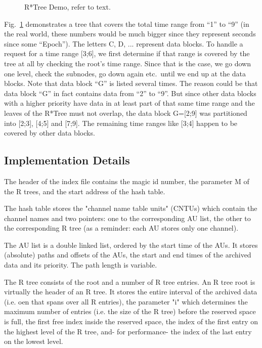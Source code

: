 \begin{figure}[htb]
\begin{center}
\end{center}
\caption{\label{fig:rtree}R*Tree Demo, refer to text.}
\end{figure}

Fig.~\ref{fig:rtree} demonstrates a tree that covers the total
time range from ``1'' to ``9'' (in the real world, these numbers would
be much bigger since they represent seconds since some ``Epoch'').
The letters C, D, ... represent data blocks. To handle a request for a
time range [3;6], we first determine if that range is covered by the tree
at all by checking the root's time range. Since that is the case,
we go down one level, check the subnodes, go down again etc.\ until
we end up at the data blocks.
Note that data block ``G'' is listed several times. The reason could
be that data block ``G'' in fact contains data from ``2'' to ``9''.
But since other data blocks with a higher priority have data in at least part
of that same time range and the leaves of the R*Tree must not overlap,
the data block G=[2;9] was partitioned into [2;3], [4;5] and [7;9].
The remaining time ranges like [3;4] happen to be covered by other
data blocks.

\subsection{Implementation Details}
The header of the index file contains the magic id number, the
parameter M of the R trees, and the start address of the hash table.

The hash table stores the "channel name table units" (CNTUs) which
contain the channel names and two pointers: one to the corresponding
AU list, the other to the corresponding R tree (as a reminder: each AU
stores only one channel).

The AU list is a double linked list, ordered by the start time of the
AUs. It stores (absolute) paths and offsets of the AUs, the start and
end times of the archived data and its priority. The path length is
variable.

The R tree consists of the root and a number of R tree entries.
An R tree root is virtually the header of an R tree. It stores the
entire interval of the archived data (i.e. oen that spans over all R
entries), the parameter "i" which determines the maximum number of
entries (i.e. the size of the R tree) before the reserved space is
full, the first free index inside the reserved space, the index of the
first entry on the highest level of the R tree, and- for performance-
the index of the last entry on the lowest level.

